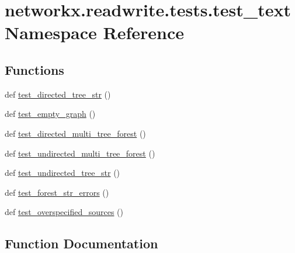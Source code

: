 \hypertarget{namespacenetworkx_1_1readwrite_1_1tests_1_1test__text}{}\section{networkx.\+readwrite.\+tests.\+test\+\_\+text Namespace Reference}
\label{namespacenetworkx_1_1readwrite_1_1tests_1_1test__text}
\subsection*{Functions}
\begin{DoxyCompactItemize}
\item 
def \hyperlink{namespacenetworkx_1_1readwrite_1_1tests_1_1test__text_a9d441c5312f5b9d78f5c1de1e96f6ae7}{test\+\_\+directed\+\_\+tree\+\_\+str} ()
\item 
def \hyperlink{namespacenetworkx_1_1readwrite_1_1tests_1_1test__text_add85b8e456d3b23366b751f499ba57a4}{test\+\_\+empty\+\_\+graph} ()
\item 
def \hyperlink{namespacenetworkx_1_1readwrite_1_1tests_1_1test__text_aaffb7033e51c8ad07a89f0aeb107848e}{test\+\_\+directed\+\_\+multi\+\_\+tree\+\_\+forest} ()
\item 
def \hyperlink{namespacenetworkx_1_1readwrite_1_1tests_1_1test__text_a30c06fd048c8d7cf12186757afe84060}{test\+\_\+undirected\+\_\+multi\+\_\+tree\+\_\+forest} ()
\item 
def \hyperlink{namespacenetworkx_1_1readwrite_1_1tests_1_1test__text_a231bd24ede2aa8bfb3267c573ec9f0a8}{test\+\_\+undirected\+\_\+tree\+\_\+str} ()
\item 
def \hyperlink{namespacenetworkx_1_1readwrite_1_1tests_1_1test__text_a2a2550c89584a6346b91d9791c6a6637}{test\+\_\+forest\+\_\+str\+\_\+errors} ()
\item 
def \hyperlink{namespacenetworkx_1_1readwrite_1_1tests_1_1test__text_abfc98812cc4f02e59bef3fb591894db6}{test\+\_\+overspecified\+\_\+sources} ()
\end{DoxyCompactItemize}


\subsection{Function Documentation}
\mbox{\label{namespacenetworkx_1_1readwrite_1_1tests_1_1test__text_aaffb7033e51c8ad07a89f0aeb107848e}} 

